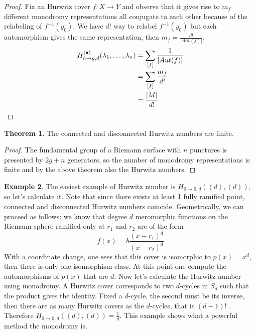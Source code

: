 \documentclass[12pt,a4paper,openright,twoside]{report}
\theoremstyle{definition} %
\newtheorem{theorem}{Theorem}[chapter]
\newtheorem{example}[theorem]{Example}
\begin{document}
\begin{proof}
    Fix an Hurwitz cover \(f:X \to Y\) and observe that it gives rise to \(m_f\) different monodromy representations all conjugate to each other because of the relabeling of \(f^{-1}(y_0)\). We have \(d!\) way to relabel \(f^{-1}(y_0)\) but each automorphism gives the same representation, then \(m_f = \frac{d!}{|Aut(f)|}\).
    \begin{align*}
        H_{h \to g,d}^{(\bullet)}(\lambda_1, \ldots, \lambda_n) &= \sum_{[f]}\frac{1}{|Aut(f)|}\\
        &= \sum_{[f]} \frac{m_f}{d!}\\
        &= \frac{|M|}{d!} \qedhere
    \end{align*}
\end{proof}

\begin{theorem}
    The connected and disconnected Hurwitz numbers are finite.
\end{theorem}

\begin{proof}
    The fundamental group of a Riemann surface with \(n\) punctures is presented by \(2g+n\) generators, so the number of monodromy representations is finite and by the above theorem also the Hurwitz numbers.
\end{proof}

\begin{example}\label{ex:genus0numbers}
    The easiest example of Hurwitz number is \(H_{0 \to 0, d}((d),(d))\), so let's calculate it. Note that since there exists at least 1 fully ramified point, connected and disconnected Hurwitz numbers coincide. Geometrically, we can proceed as follows: we know that degree \(d\) meromorphic functions on the Riemann sphere ramified only at \(r_1\) and \(r_2\) are of the form
    \[
    f(x) = b\frac{(x-r_1)^d}{(x-r_2)^d}
    \]
    With a coordinate change, one sees that this cover is isomorphic to \(p(x) = x^d\), then there is only one isomorphism class. At this point one compute the automorphisms of \(p(x)\) that are \(d\). Now let's calculate the Hurwitz number using monodromy.
    A Hurwitz cover corresponds to two \(d\)-cycles in \(S_d\) such that the product gives the identity. Fixed a \(d\)-cycle, the second must be its inverse, then there are as many Hurwitz covers as the \(d\)-cycles, that is \((d-1)!\) . 
    Therefore \(H_{0 \to 0, d}((d),(d)) = \frac{1}{d}\). This example shows what a powerful method the monodromy is.
\end{example}
\end{document}

